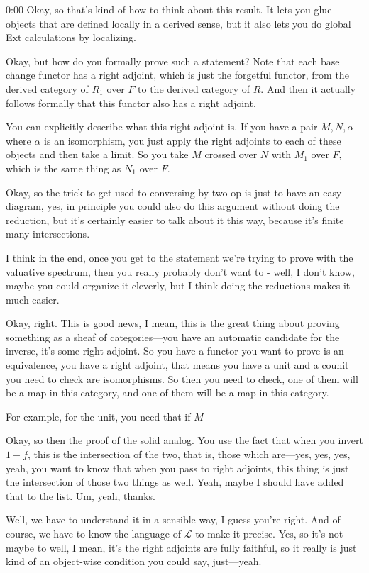 \begin{unfinished}{0:00}
Okay, so that's kind of how to think about this result. It lets you glue objects that are defined locally in a derived sense, but it also lets you do global Ext calculations by localizing.

Okay, but how do you formally prove such a statement? Note that each base change functor has a right adjoint, which is just the forgetful functor, from the derived category of $R_1$ over $F$ to the derived category of $R$. And then it actually follows formally that this functor also has a right adjoint.

You can explicitly describe what this right adjoint is. If you have a pair $M, N, \alpha$ where $\alpha$ is an isomorphism, you just apply the right adjoints to each of these objects and then take a limit. So you take $M$ crossed over $N$ with $M_1$ over $F$, which is the same thing as $N_1$ over $F$.

Okay, so the trick to get used to conversing by two op is just to have an easy diagram, yes, in principle you could also do this argument without doing the reduction, but it's certainly easier to talk about it this way, because it's finite many intersections.

I think in the end, once you get to the statement we're trying to prove with the valuative spectrum, then you really probably don't want to - well, I don't know, maybe you could organize it cleverly, but I think doing the reductions makes it much easier.

Okay, right. This is good news, I mean, this is the great thing about proving something as a sheaf of categories---you have an automatic candidate for the inverse, it's some right adjoint. So you have a functor you want to prove is an equivalence, you have a right adjoint, that means you have a unit and a counit you need to check are isomorphisms. So then you need to check, one of them will be a map in this category, and one of them will be a map in this category.

For example, for the unit, you need that if $M$

Okay, so then the proof of the solid analog. You use the fact that when you invert $1 - f$, this is the intersection of the two, that is, those which are---yes, yes, yes, yeah, you want to know that when you pass to right adjoints, this thing is just the intersection of those two things as well. Yeah, maybe I should have added that to the list. Um, yeah, thanks.

Well, we have to understand it in a sensible way, I guess you're right. And of course, we have to know the language of $\mathcal{L}$ to make it precise. Yes, so it's not---maybe to well, I mean, it's the right adjoints are fully faithful, so it really is just kind of an object-wise condition you could say, just---yeah.


\end{unfinished}
